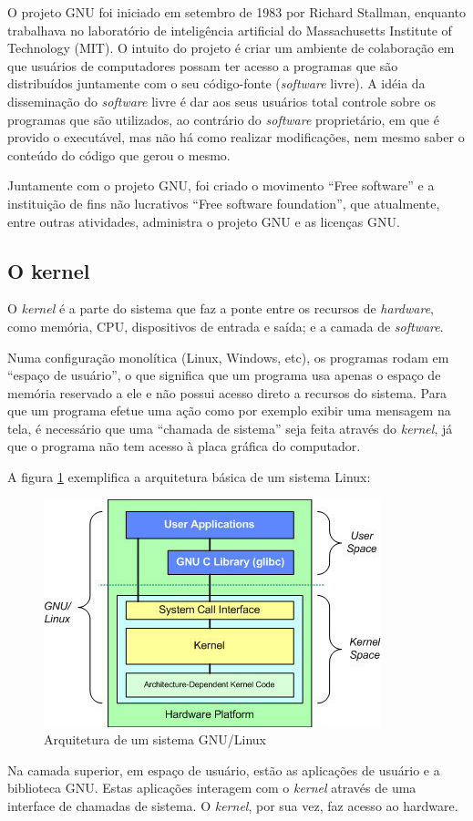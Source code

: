 \documentclass{handout_utfpr}
\begin{document}
O projeto GNU foi iniciado em setembro de 1983 por Richard Stallman, enquanto trabalhava no laboratório de inteligência artificial do Massachusetts Institute of Technology (MIT). O intuito do projeto é criar um ambiente de colaboração em que usuários de computadores possam ter acesso a programas que são distribuídos juntamente com o seu código-fonte (\textit{software} livre). A idéia da disseminação do \textit{software} livre é dar aos seus usuários total controle sobre os programas que são utilizados, ao contrário do \textit{software} proprietário, em que é provido o executável, mas não há como realizar modificações, nem mesmo saber o conteúdo do código que gerou o mesmo.

Juntamente com o projeto GNU, foi criado o movimento ``Free software'' e a instituição de fins não lucrativos ``Free software foundation'', que atualmente, entre outras atividades, administra o projeto GNU e as licenças GNU.

\subsection{O kernel}\label{kernel}
O \textit{kernel} é a parte do sistema que faz a ponte entre os recursos de \textit{hardware}, como memória, CPU, dispositivos de entrada e saída; e a camada de \textit{software}.

Numa configuração monolítica (Linux, Windows, etc), os programas rodam em ``espaço de usuário'', o que significa que um programa usa apenas o espaço de memória reservado a ele e não possui acesso direto a recursos do sistema. Para que um programa efetue uma ação como por exemplo exibir uma mensagem na tela, é necessário que uma ``chamada de sistema'' seja feita através do \textit{kernel}, já que o programa não tem acesso à placa gráfica do computador.

A figura \ref{fig:kernel} exemplifica a arquitetura básica de um sistema Linux:
\begin{figure}[!h]
  \centering
  \includegraphics[scale=.8]{imagens/kernel.jpg}
  \caption{Arquitetura de um sistema GNU/Linux}
  \label{fig:kernel}
\end{figure}
Na camada superior, em espaço de usuário, estão as aplicações de usuário e a biblioteca GNU. Estas aplicações interagem com o \textit{kernel} através de uma interface de chamadas de sistema. O \textit{kernel}, por sua vez, faz acesso ao hardware.
\end{document}
